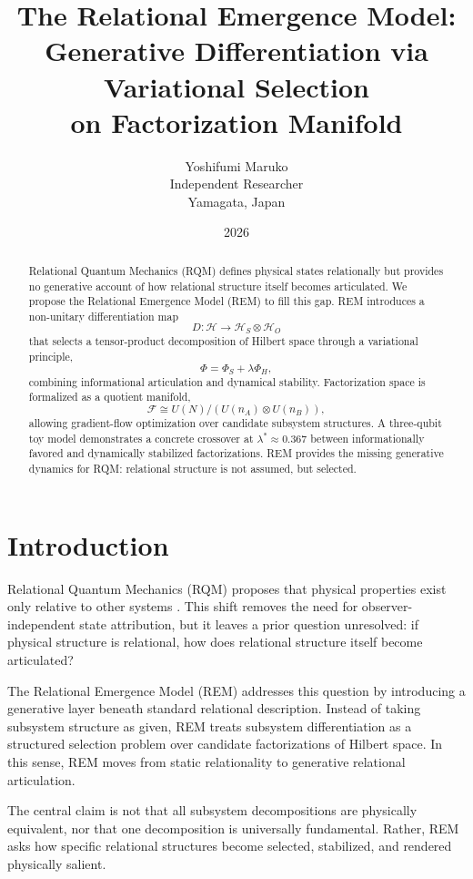 \documentclass[11pt]{article}
\title{The Relational Emergence Model:\\Generative Differentiation via Variational Selection\\on Factorization Manifold}
\author{Yoshifumi Maruko\\Independent Researcher\\Yamagata, Japan}
\date{2026}
\begin{document}
\maketitle

\begin{abstract}
Relational Quantum Mechanics (RQM) defines physical states relationally but provides no generative account of how relational structure itself becomes articulated. We propose the Relational Emergence Model (REM) to fill this gap. REM introduces a non-unitary differentiation map
\[
D:\mathcal{H}\rightarrow \mathcal{H}_S\otimes \mathcal{H}_O
\]
that selects a tensor-product decomposition of Hilbert space through a variational principle,
\[
\Phi=\Phi_S+\lambda \Phi_H,
\]
combining informational articulation and dynamical stability. Factorization space is formalized as a quotient manifold,
\[
\mathcal{F}\cong U(N)/(U(n_A)\otimes U(n_B)),
\]
allowing gradient-flow optimization over candidate subsystem structures. A three-qubit toy model demonstrates a concrete crossover at $\lambda^\ast\approx 0.367$ between informationally favored and dynamically stabilized factorizations. REM provides the missing generative dynamics for RQM: relational structure is not assumed, but selected.
\end{abstract}

\section{Introduction}
Relational Quantum Mechanics (RQM) proposes that physical properties exist only relative to other systems \cite{rovelli1996}. This shift removes the need for observer-independent state attribution, but it leaves a prior question unresolved: if physical structure is relational, how does relational structure itself become articulated?

The Relational Emergence Model (REM) addresses this question by introducing a generative layer beneath standard relational description. Instead of taking subsystem structure as given, REM treats subsystem differentiation as a structured selection problem over candidate factorizations of Hilbert space. In this sense, REM moves from static relationality to generative relational articulation.

The central claim is not that all subsystem decompositions are physically equivalent, nor that one decomposition is universally fundamental. Rather, REM asks how specific relational structures become selected, stabilized, and rendered physically salient.
\end{document}
